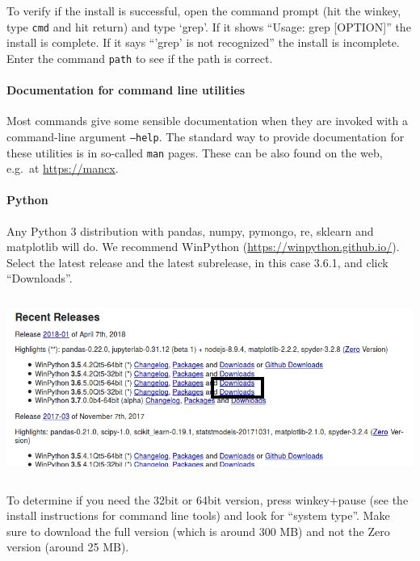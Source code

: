 \documentclass[a4paper]{report}
\begin{document}
To verify if the install is successful, open the command prompt (hit the
winkey, type \small\texttt{cmd} and hit return) and type
{\textquoteleft}grep{\textquoteright}. If it shows
{\textquotedblleft}Usage: grep [OPTION]{\textquotedblright} the install
is complete. If it says
{\textquotedblleft}{\textquoteright}grep{\textquoteright} is not
recognized{\textquotedblright} the install is incomplete. Enter the
command \small\texttt{path} to see if the path is correct.

\paragraph{Documentation for command line utilities}

Most commands give some sensible documentation when they are invoked with a
command-line argument \small\texttt{--help}. The standard way to provide
documentation for these utilities is in so-called \small\texttt{man} pages.
These can be also found on the web, e.g.\ at \url{https://mancx}.

\paragraph{Python}
Any Python 3 distribution with pandas, numpy, pymongo, re, sklearn and
matplotlib will do. We recommend WinPython
(\url{https://winpython.github.io/}). Select the latest release and the
latest subrelease, in this case 3.6.1, and click
{\textquotedblleft}Downloads{\textquotedblright}. 

\noindent\begin{center}\includegraphics[width=6.4925in,height=2.3134in]{Syllabus-download-WinPython.png}
\end{center}

To determine if you need the 32bit or 64bit version, press winkey+pause
(see the install instructions for command line tools) and look for
{\textquotedblleft}system type{\textquotedblright}. Make sure to
download the full version (which is around 300 MB) and not the Zero
version (around 25 MB).
\end{document}
